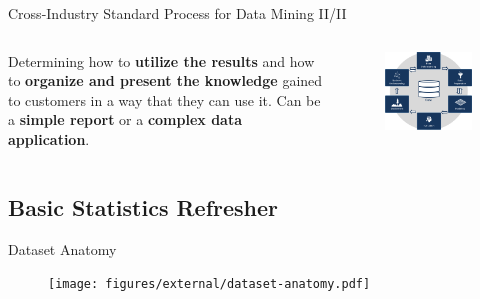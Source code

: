 \documentclass[main.tex]{subfiles}
\begin{document}
\begin{frame}{Cross-Industry Standard Process for Data Mining II/II}
\begin{columns}
\begin{column}{.6\textwidth}
\begin{justify}
                    Determining how to\textbf{ utilize the results} and how to \textbf{organize and present the knowledge} gained to customers in a way that they can use it. Can be a \textbf{simple report} or a \textbf{complex data application}.
                \end{justify}
            \end{column}
            \begin{column}{.4\textwidth}
                \begin{figure}
                    \label{fig:crisp-2}
                    \includegraphics[width=.9\textwidth]{figures/external/crisp.png}
                \end{figure}
            \end{column}
        \end{columns}
    \end{frame}

    \subsection{Basic Statistics Refresher}
    
    \begin{frame}{Dataset Anatomy}
        \begin{figure}
            \label{fig:dataset-anatomy}
            \texttt{[image: figures/external/dataset-anatomy.pdf]}
        \end{figure}
    \end{frame}
\end{document}
